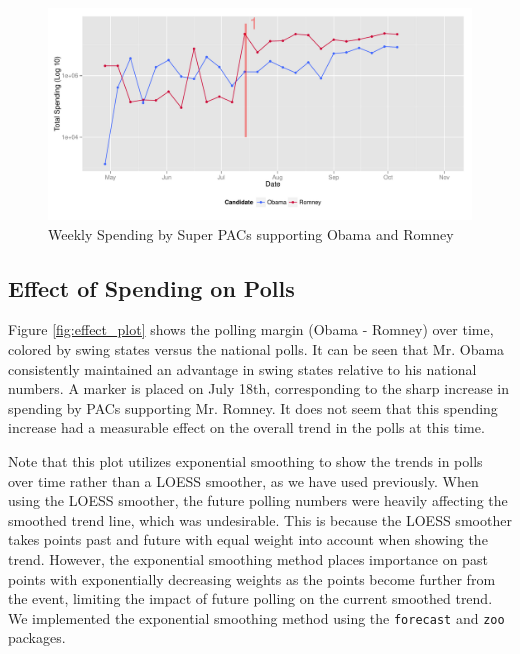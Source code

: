 \documentclass[11pt]{article}\usepackage{graphicx, color}
\newenvironment{knitrout}{}{} %
\begin{document}
\begin{knitrout}
\color{fgcolor}\begin{figure}[H]


{\centering \includegraphics[width=\textwidth]{figure/trend_plot} 

}

\caption[Weekly Spending by Super PACs supporting Obama and Romney]{Weekly Spending by Super PACs supporting Obama and Romney\label{fig:trend_plot}}
\end{figure}

\end{knitrout}


\subsection{Effect of Spending on Polls}

Figure \ref{fig:effect_plot} shows the polling margin (Obama - Romney) over time, colored by swing states versus the national polls. It can be seen that Mr. Obama consistently maintained an advantage in swing states relative to his national numbers. A marker is placed on July 18th, corresponding to the sharp increase in spending by PACs supporting Mr. Romney. It does not seem that this spending increase had a measurable effect on the overall trend in the polls at this time.

Note that this plot utilizes exponential smoothing to show the trends in polls over time rather than a LOESS smoother, as we have used previously. When using the LOESS smoother, the future polling numbers were heavily affecting the smoothed trend line, which was undesirable. This is because the LOESS smoother takes points past and future with equal weight into account when showing the trend. However, the exponential smoothing method places importance on past points with exponentially decreasing weights as the points become further from the event, limiting the impact of future polling on the current smoothed trend. We implemented the exponential smoothing method using the \texttt{forecast} and \texttt{zoo} packages.
\end{document}

